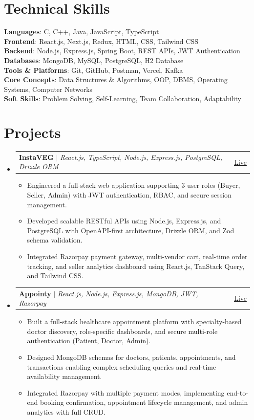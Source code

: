 \documentclass[letterpaper,11pt]{article}
\makeatletter
\newcommand{\resumeItem}[1]{
  \item\small{
    {#1 \vspace{-2pt}}
  }
}
\newcommand{\resumeProjectHeading}[2]{
    \item
    \begin{tabular*}{0.97\textwidth}{l@{\extracolsep{\fill}}r}
      \small#1 & #2 \\
    \end{tabular*}\vspace{-7pt}
}
\newcommand{\resumeSubHeadingListStart}{\begin{itemize}[leftmargin=0.15in, label={}]}
\newcommand{\resumeSubHeadingListEnd}{\end{itemize}}
\newcommand{\resumeItemListStart}{\begin{itemize}[label=$\vcenter{\hbox{\tiny$\bullet$}}$]}
\newcommand{\resumeItemListEnd}{\end{itemize}\vspace{-5pt}}
\makeatother
\begin{document}
  \section{Technical Skills}
 \begin{itemize}[leftmargin=0.15in, label={}]
    \small{\item{
     \textbf{Languages}{: C, C++, Java, JavaScript, TypeScript} \\
     \textbf{Frontend}{: React.js, Next.js, Redux, HTML, CSS, Tailwind CSS} \\
     \textbf{Backend}{: Node.js, Express.js, Spring Boot, REST APIs, JWT Authentication} \\
     \textbf{Databases}{: MongoDB, MySQL, PostgreSQL, H2 Database} \\
     \textbf{Tools \& Platforms}{: Git, GitHub, Postman, Vercel, Kafka} \\
     \textbf{Core Concepts}{: Data Structures \& Algorithms, OOP, DBMS, Operating Systems, Computer Networks} \\
     \textbf{Soft Skills}{: Problem Solving, Self-Learning, Team Collaboration, Adaptability} \\
    }}
 \end{itemize}


\section{Projects}
\resumeSubHeadingListStart
\resumeProjectHeading
{\textbf{InstaVEG} $|$ \emph{React.js, TypeScript, Node.js, Express.js, PostgreSQL, Drizzle ORM}}{\href{https://green-mart-connect--mnvj69.replit.app/}{\underline{Live}}}
\resumeItemListStart
\resumeItem{Engineered a full-stack web application supporting 3 user roles (Buyer, Seller, Admin) with JWT authentication, RBAC, and secure session management.}
\resumeItem{Developed scalable RESTful APIs using Node.js, Express.js, and PostgreSQL with OpenAPI-first architecture, Drizzle ORM, and Zod schema validation.}
\resumeItem{Integrated Razorpay payment gateway, multi-vendor cart, real-time order tracking, and seller analytics dashboard using React.js, TanStack Query, and Tailwind CSS.}
\resumeItemListEnd

\resumeProjectHeading
{\textbf{Appointy} $|$ \emph{React.js, Node.js, Express.js, MongoDB, JWT, Razorpay}}{\href{https://appointy-roan.vercel.app/}{\underline{Live}}}
\resumeItemListStart
\resumeItem{Built a full-stack healthcare appointment platform with specialty-based doctor discovery, role-specific dashboards, and secure multi-role authentication (Patient, Doctor, Admin).}
\resumeItem{Designed MongoDB schemas for doctors, patients, appointments, and transactions enabling complex scheduling queries and real-time availability management.}
\resumeItem{Integrated Razorpay with multiple payment modes, implementing end-to-end booking confirmation, appointment lifecycle management, and admin analytics with full CRUD.}
\resumeItemListEnd
\resumeSubHeadingListEnd
\end{document}
